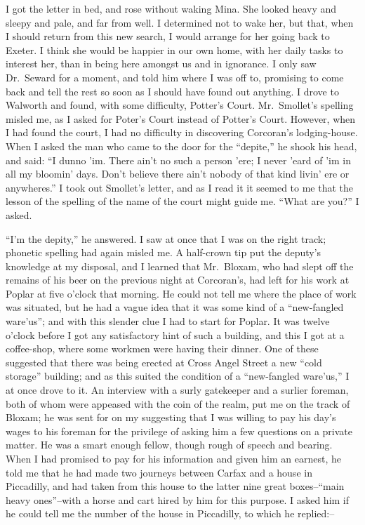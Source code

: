 \documentclass[12pt,openright]{book}
\begin{document}
I got the letter in bed, and rose without waking Mina. She looked heavy and sleepy and pale, and far from well. I determined not to wake her, but that, when I should return from this new search, I would arrange for her going back to Exeter. I think she would be happier in our own home, with her daily tasks to interest her, than in being here amongst us and in ignorance. I only saw Dr. Seward for a moment, and told him where I was off to, promising to come back and tell the rest so soon as I should have found out anything. I drove to Walworth and found, with some difficulty, Potter’s Court. Mr. Smollet’s spelling misled me, as I asked for Poter’s Court instead of Potter’s Court. However, when I had found the court, I had no difficulty in discovering Corcoran’s lodging-house. When I asked the man who came to the door for the “depite,” he shook his head, and said: “I dunno ’im. There ain’t no such a person ’ere; I never ’eard of ’im in all my bloomin’ days. Don’t believe there ain’t nobody of that kind livin’ ere or anywheres.” I took out Smollet’s letter, and as I read it it seemed to me that the lesson of the spelling of the name of the court might guide me. “What are you?” I asked.

“I’m the depity,” he answered. I saw at once that I was on the right track; phonetic spelling had again misled me. A half-crown tip put the deputy’s knowledge at my disposal, and I learned that Mr. Bloxam, who had slept off the remains of his beer on the previous night at Corcoran’s, had left for his work at Poplar at five o’clock that morning. He could not tell me where the place of work was situated, but he had a vague idea that it was some kind of a “new-fangled ware’us”; and with this slender clue I had to start for Poplar. It was twelve o’clock before I got any satisfactory hint of such a building, and this I got at a coffee-shop, where some workmen were having their dinner. One of these suggested that there was being erected at Cross Angel Street a new “cold storage” building; and as this suited the condition of a “new-fangled ware’us,” I at once drove to it. An interview with a surly gatekeeper and a surlier foreman, both of whom were appeased with the coin of the realm, put me on the track of Bloxam; he was sent for on my suggesting that I was willing to pay his day’s wages to his foreman for the privilege of asking him a few questions on a private matter. He was a smart enough fellow, though rough of speech and bearing. When I had promised to pay for his information and given him an earnest, he told me that he had made two journeys between Carfax and a house in Piccadilly, and had taken from this house to the latter nine great boxes–“main heavy ones”–with a horse and cart hired by him for this purpose. I asked him if he could tell me the number of the house in Piccadilly, to which he replied:–
\end{document}
